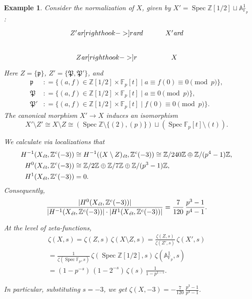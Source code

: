 \documentclass[draft]{article}
\DeclareMathOperator{\Spec}{Spec}
\newcommand{\FF}{\mathbb{F}}
\newcommand{\ZZ}{\mathbb{Z}}
\renewcommand{\AA}{\mathbb{A}}
\newcommand{\ar}{\text{\it ar}}
\newcommand{\et}{\text{\it \'{e}t}}
\newcommand{\dfn}{\mathrel{\mathop:}=}
\theoremstyle{myplain}
\theoremstyle{mydefinition}
\newtheorem{example}[theorem]{Example}
\begin{document}
\begin{example}
  Consider the normalization of $X$, given by
  $X' = \Spec \ZZ [1/2] \sqcup \AA^1_{\FF_p}$:
  \[ \begin{tikzcd}
      Z' \ar[right hook->]{r}\ar{d} & X' \ar{d} \\
      Z \ar[right hook->]{r} & X
    \end{tikzcd} \]
  Here $Z = \{ \mathfrak{p} \}$, $Z' = \{ \mathfrak{P}, \mathfrak{P}' \}$,
  and
  \begin{align*}
    \mathfrak{p} & \dfn \{ (a,f) \in \ZZ [1/2] \times \FF_p [t] \mid a \equiv f(0) \equiv 0 \pmod{p} \}, \\
    \mathfrak{P} & \dfn \{ (a,f) \in \ZZ [1/2] \times \FF_p [t] \mid a \equiv 0 \pmod{p} \}, \\
    \mathfrak{P}' & \dfn \{ (a,f) \in \ZZ [1/2] \times \FF_p [t] \mid f(0) \equiv 0 \pmod{p} \}.
  \end{align*}
  The canonical morphism $X' \to X$ induces an isomorphism
  \[ X'\setminus Z' \cong X\setminus Z \cong
    (\Spec \ZZ \setminus \{ (2), (p) \}) \sqcup
    (\Spec \FF_p [t] \setminus (t)). \]

  We calculate via localizations that
  \begin{align*}
    H^{-1} (X_\et, \ZZ^c (-3)) & \cong H^{-1} ((X\setminus Z)_\et, \ZZ^c (-3)) \cong
                                 \ZZ/240\ZZ \oplus \ZZ/(p^4 - 1)\ZZ, \\
    H^0 (X_\et, \ZZ^c (-3)) & \cong \ZZ/2\ZZ \oplus \ZZ/7\ZZ \oplus \ZZ/(p^3 - 1)\ZZ, \\
    H^1 (X_\et, \ZZ^c (-3)) & = 0.
  \end{align*}
  Consequently,
  \[ \frac{|H^0 (X_\et, \ZZ^c (-3))|}{|H^{-1} (X_\et, \ZZ^c (-3))|\cdot |H^1 (X_\et, \ZZ^c (-3))|} =
    \frac{7}{120}\,\frac{p^3-1}{p^4 - 1}. \]

  At the level of zeta-functions,
  \begin{multline*}
    \zeta (X,s) =
    \zeta (Z,s)\,\zeta (X\setminus Z,s) =
    \frac{\zeta (Z,s)}{\zeta (Z',s)}\,\zeta (X',s) \\
    = \frac{1}{\zeta (\Spec \FF_p,s)}\,\zeta (\Spec \ZZ[1/2],s)\,\zeta (\AA^1_{\FF_p},s) \\
    = (1-p^{-s})\,(1 - 2^{-s})\,\zeta (s)\,\frac{1}{1 - p^{1-s}}.
  \end{multline*}

  In particular, substituting $s = -3$, we get
  $\zeta (X,-3) = -\frac{7}{120}\,\frac{p^3 - 1}{p^4 - 1}$.
\end{example}


\pagebreak


\end{document}
